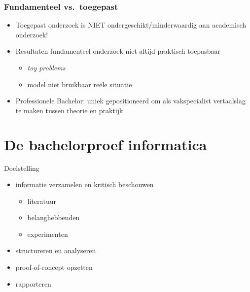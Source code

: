 \documentclass[aspectratio=169]{beamer}
\begin{document}
\begin{frame}
  \frametitle{Fundamenteel vs.\ toegepast}

  \begin{itemize}
    \item Toegepast onderzoek is NIET ondergeschikt/minderwaardig aan academisch onderzoek!
    \item Resultaten fundamenteel onderzoek niet altijd praktisch toepasbaar
          \begin{itemize}
            \item \textit{toy problems}
            \item model niet bruikbaar reële situatie
          \end{itemize}
    \item Professionele Bachelor: uniek gepositioneerd om als vakspecialist vertaalslag te maken tussen theorie en praktijk
  \end{itemize}

\end{frame}

\section{De bachelorproef informatica}

\begin{frame}{Doelstelling}


  \begin{itemize}
    \item informatie verzamelen en kritisch beschouwen
          \begin{itemize}
            \item literatuur
            \item belanghebbenden
            \item experimenten
          \end{itemize}
    \item structureren en analyseren
    \item proof-of-concept opzetten
    \item rapporteren
  \end{itemize}

\end{frame}
\end{document}
